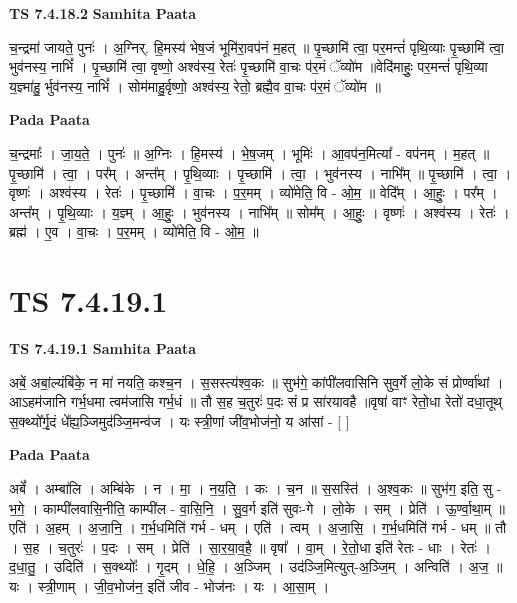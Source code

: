 \documentclass[17pt]{extarticle}
\begin{document}
\textbf{TS 7.4.18.2 } \newline
\textbf{Samhita Paata} \newline

च॒न्द्रमा॑ जायते॒ पुनः॑ । अ॒ग्निर्. हि॒मस्य॑ भेष॒जं भूमि॑रा॒वप॑नं म॒हत् ॥ पृ॒च्छामि॑ त्वा॒ पर॒मन्तं॑ पृथि॒व्याः पृ॒च्छामि॑ त्वा॒ भुव॑नस्य॒ नाभिं᳚ । पृ॒च्छामि॑ त्वा॒ वृष्णो॒ अश्व॑स्य॒ रेतः॑ पृ॒च्छामि॑ वा॒चः प॑र॒मं ॅव्यो॑म ॥वेदि॑माहुः॒ पर॒मन्तं॑ पृथि॒व्या य॒ज्ञ्मा॑हु॒ र्भुव॑नस्य॒ नाभिं᳚ । सोम॑माहु॒र्वृष्णो॒ अश्व॑स्य॒ रेतो॒ ब्रह्मै॒व वा॒चः प॑र॒मं ॅव्यो॑म ॥ \newline

\textbf{Pada Paata} \newline

च॒न्द्रमाः᳚ । जा॒य॒ते॒ । पुनः॑ ॥ अ॒ग्निः । हि॒मस्य॑ । भे॒ष॒जम् । भूमिः॑ । आ॒वप॑न॒मित्या᳚ - वप॑नम् । म॒हत् ॥ पृ॒च्छामि॑ । त्वा॒ । पर᳚म् । अन्त᳚म् । पृ॒थि॒व्याः । पृ॒च्छामि॑ । त्वा॒ । भुव॑नस्य । नाभि᳚म् ॥ पृ॒च्छामि॑ । त्वा॒ । वृष्णः॑ । अश्व॑स्य । रेतः॑ । पृ॒च्छामि॑ । वा॒चः । प॒र॒मम् । व्यो॑मेति॒ वि - ओ॒म॒ ॥ वेदि᳚म् । आ॒हुः॒ । पर᳚म् । अन्त᳚म् । पृ॒थि॒व्याः । य॒ज्ञ्म् । आ॒हुः॒ । भुव॑नस्य । नाभि᳚म् ॥ सोम᳚म् । आ॒हुः॒ । वृष्णः॑ । अश्व॑स्य । रेतः॑ । ब्रह्म॑ । ए॒व । वा॒चः । प॒र॒मम् । व्यो॑मेति॒ वि - ओ॒म॒ ॥  \newline





\section{ TS 7.4.19.1 }

\textbf{TS 7.4.19.1 } \newline
\textbf{Samhita Paata} \newline

अबें॒ अबां॒ल्यंबि॑के॒ न मा॑ नयति॒ कश्च॒न । स॒सस्त्य॑श्व॒कः ॥ सुभ॑गे॒ कांपी॑लवासिनि सुव॒र्गे लो॒के सं प्रोर्ण्वा॑थां ।आऽहम॑जानि गर्भ॒धमा त्वम॑जासि गर्भ॒धं ॥ तौ स॒ह च॒तुरः॑ प॒दः सं प्र सा॑रयावहै ॥वृषा॑ वाꣳ रेतो॒धा रेतो॑ दधा॒तूथ् स॒क्थ्यो᳚र्गृ॒दं धे᳚ह्य॒ञ्जिमुद॑ञ्जि॒मन्व॑ज । यः स्त्री॒णां जी॑व॒भोज॑नो॒ य आ॑सां - [  ] \newline

\textbf{Pada Paata} \newline

अबें᳚ । अम्बा॑लि । अम्बि॑के । न । मा॒ । न॒य॒ति॒ । कः । च॒न ॥ स॒सस्ति॑ । अ॒श्व॒कः ॥ सुभ॑ग॒ इति॒ सु - भ॒गे॒ । काम्पी॑लवासि॒नीति॒ काम्पी॑ल - वा॒सि॒नि॒ । सु॒व॒र्ग इति॑ सुवः-गे । लो॒के । सम् । प्रेति॑ । ऊ॒र्ण्वा॒था॒म् ॥ एति॑ । अ॒हम् । अ॒जा॒नि॒ । ग॒र्भ॒धमिति॑ गर्भ - धम् । एति॑ । त्वम् । अ॒जा॒सि॒ । ग॒र्भ॒धमिति॑ गर्भ - धम् ॥ तौ । स॒ह । च॒तुरः॑ । प॒दः । सम् । प्रेति॑ । सा॒र॒या॒व॒है॒ ॥ वृषा᳚ । वा॒म् । रे॒तो॒धा इति॑ रेतः - धाः । रेतः॑ । द॒धा॒तु॒ । उदिति॑ । स॒क्थ्योः᳚ । गृ॒दम् । धे॒हि॒ । अ॒ञ्जिम् । उद॑ञ्जि॒मित्युत्-अ॒ञ्जि॒म् । अन्विति॑ । अ॒ज॒ ॥ यः । स्त्री॒णाम् । जी॒व॒भोज॑न॒ इति॑ जीव - भोज॑नः । यः । आ॒सा॒म् ।  \newline
\end{document}
